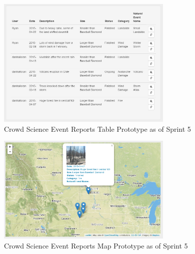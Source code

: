 \begin{figure}[tbh]
\begin{center}
\includegraphics[width=0.75\textwidth]{./figures/prototype_S5_table.png}
\end{center}
\caption{Crowd Science Event Reports Table Prototype as of Sprint 5\label{prototype_S5_table}}
\end{figure}

\begin{figure}[tbh]
\begin{center}
\includegraphics[width=0.75\textwidth]{./figures/prototype_S5_map.png}
\end{center}
\caption{Crowd Science Event Reports Map Prototype as of Sprint 5\label{prototype_S5_map}}
\end{figure}

